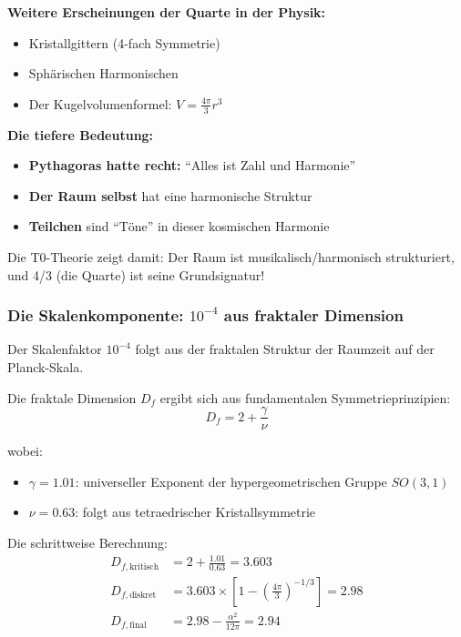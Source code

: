 \documentclass[12pt,a4paper]{article}
\theoremstyle{definition}
\begin{document}
\textbf{Weitere Erscheinungen der Quarte in der Physik:}
\begin{itemize}
	\item Kristallgittern (4-fach Symmetrie)
	\item Sph\"arischen Harmonischen
	\item Der Kugelvolumenformel: $V = \frac{4\pi}{3}r^3$
\end{itemize}

\textbf{Die tiefere Bedeutung:}
\begin{itemize}
	\item \textbf{Pythagoras hatte recht:} ``Alles ist Zahl und Harmonie''
	\item \textbf{Der Raum selbst} hat eine harmonische Struktur
	\item \textbf{Teilchen} sind ``T\"one'' in dieser kosmischen Harmonie
\end{itemize}

Die T0-Theorie zeigt damit: Der Raum ist musikalisch/harmonisch strukturiert, und 4/3 (die Quarte) ist seine Grundsignatur!

\subsubsection{Die Skalenkomponente: $10^{-4}$ aus fraktaler Dimension}

Der Skalenfaktor $10^{-4}$ folgt aus der fraktalen Struktur der Raumzeit auf der Planck-Skala.

Die fraktale Dimension $D_f$ ergibt sich aus fundamentalen Symmetrieprinzipien:
\begin{equation}
	D_f = 2 + \frac{\gamma}{\nu}
\end{equation}

wobei:
\begin{itemize}
	\item $\gamma = 1.01$: universeller Exponent der hypergeometrischen Gruppe $SO(3,1)$
	\item $\nu = 0.63$: folgt aus tetraedrischer Kristallsymmetrie
\end{itemize}

Die schrittweise Berechnung:
\begin{align}
	D_{f,\text{kritisch}} &= 2 + \frac{1.01}{0.63} = 3.603\\
	D_{f,\text{diskret}} &= 3.603 \times \left[1 - \left(\frac{4\pi}{3}\right)^{-1/3}\right] = 2.98\\
	D_{f,\text{final}} &= 2.98 - \frac{\alpha^2}{12\pi} = 2.94
\end{align}
\end{document}
